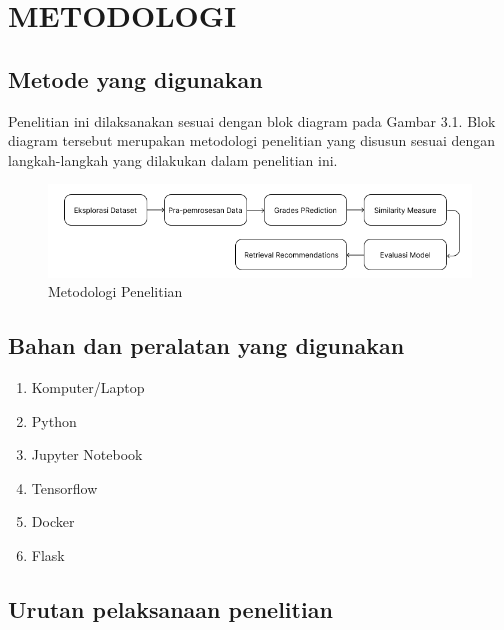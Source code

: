 \chapter{METODOLOGI}

\section{Metode yang digunakan}

Penelitian ini dilaksanakan sesuai dengan blok diagram pada Gambar 3.1. Blok diagram tersebut
merupakan metodologi penelitian yang disusun sesuai dengan langkah-langkah yang dilakukan dalam penelitian ini.

\begin{figure} [ht] \centering
  \includegraphics[width=160mm]{gambar/diagram-blok.png}
  \caption{Metodologi Penelitian}
\end{figure}

\section{Bahan dan peralatan yang digunakan}
\begin{enumerate}
  \item Komputer/Laptop
  \item Python
  \item Jupyter Notebook
  \item Tensorflow
  \item Docker
  \item Flask
\end{enumerate}

\section{Urutan pelaksanaan penelitian}


